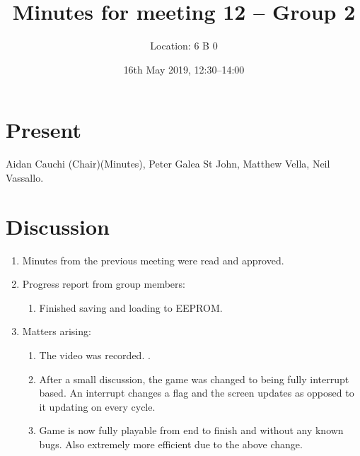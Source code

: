 \documentclass[11pt,a4paper]{article}
\title{ Minutes for meeting 12 -- Group 2}
\author{Location: 6 B 0}
\date{16th May 2019, 12:30--14:00}
\begin{document}
\maketitle

\section*{Present}
Aidan Cauchi (Chair)(Minutes),
Peter Galea St John,
Matthew Vella,
Neil Vassallo.



\section*{Discussion}

\begin{enumerate}


\item Minutes from the previous meeting were read and approved.

\item Progress report from group members:
   \begin{enumerate}
   \item Finished saving and loading to EEPROM.
  
   \end{enumerate}


\item Matters arising:
\begin{enumerate}
	\item The video was recorded.
	. \item After a small discussion, the game was changed to being fully interrupt based. An interrupt changes a flag and the screen updates as opposed to it updating on every cycle.
	\item Game is now fully playable from end to finish and without any known bugs. Also extremely more efficient due to the above change.

\end{enumerate}

\end{enumerate}
\end{document}
